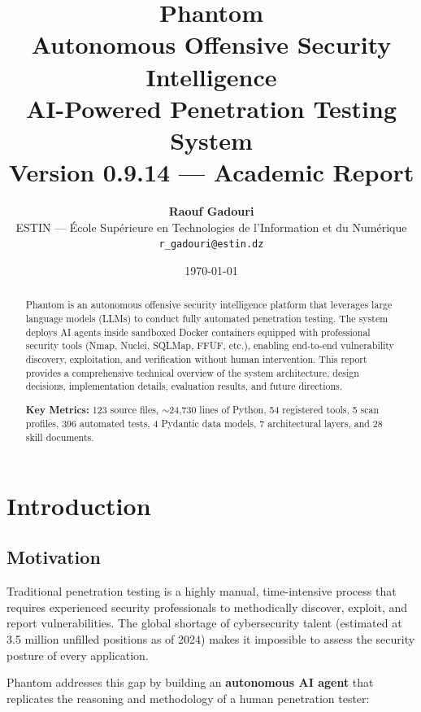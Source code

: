 \documentclass[12pt,a4paper]{article}
\title{
    \vspace{-1cm}
    {\Huge\bfseries\color{phantomred} Phantom}\\[0.3cm]
    {\Large Autonomous Offensive Security Intelligence}\\[0.5cm]
    {\large AI-Powered Penetration Testing System}\\[0.3cm]
    {\normalsize Version 0.9.14 — Academic Report}
}
\author{
    \textbf{Raouf Gadouri}\\
    ESTIN — \'{E}cole Sup\'{e}rieure en Technologies de l'Information et du Num\'{e}rique\\
    \texttt{r\_gadouri@estin.dz}
}
\date{\today}
\begin{document}
\maketitle
\thispagestyle{fancy}

\begin{abstract}
\noindent
Phantom is an autonomous offensive security intelligence platform that leverages
large language models (LLMs) to conduct fully automated penetration testing.
The system deploys AI agents inside sandboxed Docker containers equipped with
professional security tools (Nmap, Nuclei, SQLMap, FFUF, etc.), enabling
end-to-end vulnerability discovery, exploitation, and verification without
human intervention. This report provides a comprehensive technical overview
of the system architecture, design decisions, implementation details,
evaluation results, and future directions.

\medskip\noindent
\textbf{Key Metrics:} 123 source files, $\sim$24,730 lines of Python,
54 registered tools, 5 scan profiles, 396 automated tests, 4 Pydantic data
models, 7 architectural layers, and 28 skill documents.
\end{abstract}

\tableofcontents
\newpage

\section{Introduction}

\subsection{Motivation}

Traditional penetration testing is a highly manual, time-intensive process that
requires experienced security professionals to methodically discover, exploit,
and report vulnerabilities. The global shortage of cybersecurity talent
(estimated at 3.5 million unfilled positions as of 2024) makes it impossible
to assess the security posture of every application.

Phantom addresses this gap by building an \textbf{autonomous AI agent} that
replicates the reasoning and methodology of a human penetration tester:
\end{document}
